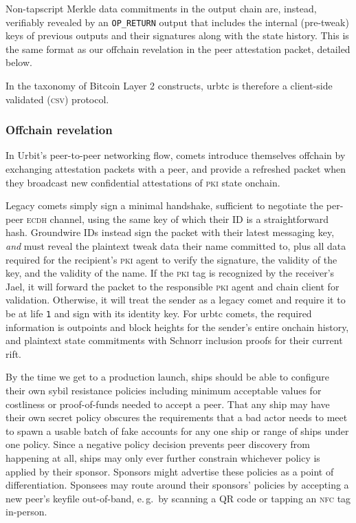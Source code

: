 \documentclass[twoside]{article}
\begin{document}
Non-tapscript Merkle data commitments in the output chain are, instead,
verifiably revealed by an \texttt{OP\_RETURN} output that includes the
internal (pre-tweak) keys of previous outputs and their signatures along
with the state history. This is the same format as our offchain
revelation in the peer attestation packet, detailed below.

In the taxonomy of Bitcoin Layer 2 constructs, urbtc is therefore a
client-side validated (\textsc{csv}) protocol.

\subsubsection{Offchain revelation}\label{offchain-revelation}

In Urbit's peer-to-peer networking flow, comets introduce themselves offchain by exchanging attestation packets
with a peer, and provide a refreshed packet when they broadcast new
confidential attestations of \textsc{pki} state onchain.

Legacy comets simply sign a minimal handshake, sufficient to negotiate
the per-peer \textsc{ecdh} channel, using the same key of which their ID is a
straightforward hash. Groundwire IDs instead sign the packet with their
latest messaging key, \emph{and} must reveal the plaintext tweak data
their name committed to, plus all data required for the recipient's \textsc{pki}
agent to verify the signature, the validity of the key, and the validity
of the name. If the \textsc{pki} tag is recognized by the receiver's Jael, it
will forward the packet to the responsible \textsc{pki} agent and chain client
for validation. Otherwise, it will treat the sender as a legacy comet
and require it to be at life \texttt{1} and sign with its identity key. For urbtc
comets, the required information is outpoints and block heights for the
sender's entire onchain history, and plaintext state commitments with
Schnorr inclusion proofs for their current rift.

By the time we get to a production launch, ships should be able to
configure their own sybil resistance policies including minimum
acceptable values for costliness or proof-of-funds needed to accept a
peer. That any ship may have their own secret policy obscures the
requirements that a bad actor needs to meet to spawn a usable batch of
fake accounts for any one ship or range of ships under one policy. Since
a negative policy decision prevents peer discovery from happening at
all, ships may only ever further constrain whichever policy is applied
by their sponsor. Sponsors might advertise these policies as a point of
differentiation. Sponsees may route around their sponsors' policies by
accepting a new peer's keyfile out-of-band, e.\,g.\ by scanning a QR code
or tapping an \textsc{nfc} tag in-person.
\end{document}
